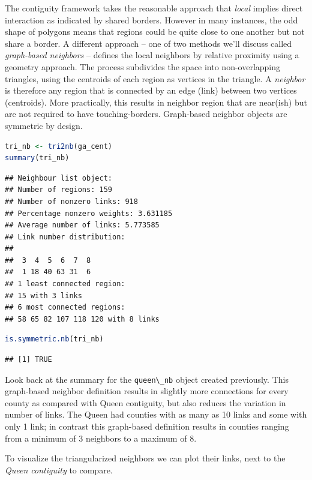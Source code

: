 \documentclass[
]{book}
\newcommand{\passthrough}[1]{#1}
\begin{document}
The contiguity framework takes the reasonable approach that \emph{local} implies direct interaction as indicated by shared borders. However in many instances, the odd shape of polygons means that regions could be quite close to one another but not share a border. A different approach -- one of two methods we'll discuss called \emph{graph-based neighbors} -- defines the local neighbors by relative proximity using a geometry approach. The process subdivides the space into non-overlapping triangles, using the centroids of each region as vertices in the triangle. A \emph{neighbor} is therefore any region that is connected by an edge (link) between two vertices (centroids). More practically, this results in neighbor region that are near(ish) but are not required to have touching-borders. Graph-based neighbor objects are symmetric by design.

\begin{lstlisting}[language=R]
tri_nb <- tri2nb(ga_cent)
summary(tri_nb)
\end{lstlisting}

\begin{lstlisting}
## Neighbour list object:
## Number of regions: 159 
## Number of nonzero links: 918 
## Percentage nonzero weights: 3.631185 
## Average number of links: 5.773585 
## Link number distribution:
## 
##  3  4  5  6  7  8 
##  1 18 40 63 31  6 
## 1 least connected region:
## 15 with 3 links
## 6 most connected regions:
## 58 65 82 107 118 120 with 8 links
\end{lstlisting}

\begin{lstlisting}[language=R]
is.symmetric.nb(tri_nb)
\end{lstlisting}

\begin{lstlisting}
## [1] TRUE
\end{lstlisting}

Look back at the summary for the \passthrough{\lstinline!queen\_nb!} object created previously. This graph-based neighbor definition results in slightly more connections for every county as compared with Queen contiguity, but also reduces the variation in number of links. The Queen had counties with as many as 10 links and some with only 1 link; in contrast this graph-based definition results in counties ranging from a minimum of 3 neighbors to a maximum of 8.

To visualize the triangularized neighbors we can plot their links, next to the \emph{Queen contiguity} to compare.
\end{document}
